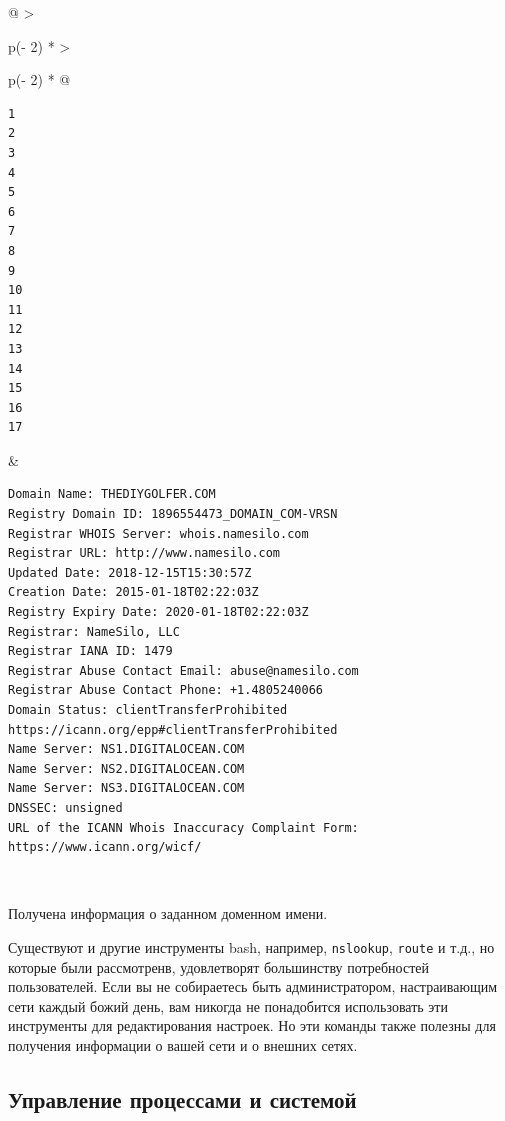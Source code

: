 \documentclass{article}
\begin{document}
\begin{longtable}[]{@{}
  >{\raggedright\arraybackslash}p{(\columnwidth - 2\tabcolsep) * }
  >{\raggedright\arraybackslash}p{(\columnwidth - 2\tabcolsep) * }@{}}
\toprule
\endhead
\begin{minipage}[t]{\linewidth}\raggedright
\begin{verbatim}
1
2
3
4
5
6
7
8
9
10
11
12
13
14
15
16
17
\end{verbatim}
\end{minipage} & \begin{minipage}[t]{\linewidth}\raggedright
\begin{verbatim}
Domain Name: THEDIYGOLFER.COM
Registry Domain ID: 1896554473_DOMAIN_COM-VRSN
Registrar WHOIS Server: whois.namesilo.com
Registrar URL: http://www.namesilo.com
Updated Date: 2018-12-15T15:30:57Z
Creation Date: 2015-01-18T02:22:03Z
Registry Expiry Date: 2020-01-18T02:22:03Z
Registrar: NameSilo, LLC
Registrar IANA ID: 1479
Registrar Abuse Contact Email: abuse@namesilo.com
Registrar Abuse Contact Phone: +1.4805240066
Domain Status: clientTransferProhibited https://icann.org/epp#clientTransferProhibited
Name Server: NS1.DIGITALOCEAN.COM
Name Server: NS2.DIGITALOCEAN.COM
Name Server: NS3.DIGITALOCEAN.COM
DNSSEC: unsigned
URL of the ICANN Whois Inaccuracy Complaint Form: https://www.icann.org/wicf/
\end{verbatim}
\end{minipage} \\ \addlinespace
\bottomrule
\end{longtable}

Получена информация о заданном доменном имени.

Существуют и другие инструменты bash, например, \texttt{nslookup},
\texttt{route} и т.д., но которые были рассмотренв, удовлетворят
большинству потребностей пользователей. Если вы не собираетесь быть
администратором, настраивающим сети каждый божий день, вам никогда не
понадобится использовать эти инструменты для редактирования настроек. Но
эти команды также полезны для получения информации о вашей сети и о
внешних сетях.

\hypertarget{Process-Management-and-System-Management}{%
\subsection{\texorpdfstring{\protect\hyperlink{Process-Management-and-System-Management}{}Управление
процессами и
системой}{Управление процессами и системой}}\label{Process-Management-and-System-Management}}
\end{document}
